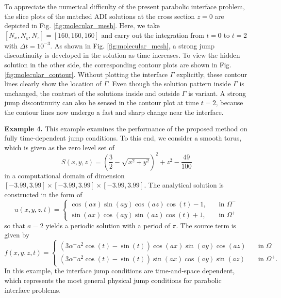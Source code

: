 \documentclass[dissertation]{uathesis}
\begin{document}
\begin{body}
\begin{flushleft}
\hspace{1cm} To appreciate the numerical difficulty of the present parabolic interface problem, the slice plots of the 
matched ADI solutions at the cross section $z=0$ are depicted in Fig. \ref{fig:molecular_mesh}.
Here, we take $[N_{x},N_{y},N_{z}]=[160,160,160]$ and carry out the integration from $t=0$ to $t=2$ with
$\Delta t=10^{-3}$. 
As shown in Fig. \ref{fig:molecular_mesh}, a strong jump discontinuity is developed in the solution as time increases. 
To view the hidden solution in the other side, the corresponding contour plots are shown in 
Fig. \ref{fig:molecular_contour}.
Without plotting the interface $\Gamma$ explicitly, these contour lines clearly show the location
of $\Gamma$. Even though the solution pattern inside $\Gamma$ is unchanged, the contrast of the solutions
inside and outside $\Gamma$ is variant. A strong jump discontinuity can also be sensed in the contour
plot at time $t=2$, because the contour lines now undergo a fast and sharp change near the interface. 


{\flushleft \bf Example 4.} This example examines the performance of the proposed method on fully time-dependent jump conditions. To this end, we consider a smooth torus, which is given as the zero level set of
%
\begin{equation}
S(x,y,z) = (\frac{3}{2}-\sqrt{x^{2}+y^{2}})^{2}+z^{2}-\frac{49}{100}
\end{equation}
%
in a computational domain of dimension $[-3.99,3.99]\times[-3.99,3.99]\times[-3.99,3.99]$. The analytical solution is constructed in the form of 
%
\begin{equation} \label{analytical_eqn_2}
u(x,y,z,t)= 
\begin{cases}
\cos(ax)\sin(ay)\cos(az)\cos(t)-1, \quad   &\mbox{in } \Omega^{-} \\
\sin(ax)\cos(ay)\sin(az)\cos(t)+1,  \quad   &\mbox{in } \Omega^{+}
\end{cases}
\end{equation}
%
so that $a=2$ yields a periodic solution with a period of $\pi$. The source term is given by
%
\begin{equation} \label{source_eqn_2}
f(x,y,z,t)= 
\begin{cases}
(3 \alpha^{-} a^{2}\cos(t)-\sin(t)) \cos(ax)\sin(ay)\cos(az) \quad   &\mbox{in } \Omega^{-} \\
(3 \alpha^{+} a^{2}\cos(t)-\sin(t)) \sin(ax)\cos(ay)\sin(az)  \quad   &\mbox{in } \Omega^{+}.
\end{cases}
\end{equation}
%
In this example, the interface jump conditions are time-and-space dependent, which represents the most general physical jump conditions for parabolic interface problems. 


\end{flushleft}
\end{body}
\end{document}
